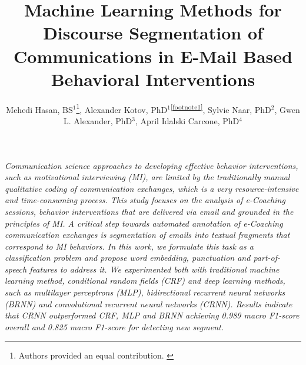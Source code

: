 \documentclass{amia}
\begin{document}
\title{Machine Learning Methods for Discourse Segmentation of Communications in E-Mail Based Behavioral Interventions}

\author{Mehedi Hasan, BS$^{1}$\footnote{Authors provided an equal contribution. \label{footnote1}}, Alexander Kotov, PhD$^{1}$\textsuperscript{\ref{footnote1}}, Sylvie Naar, PhD$^{2}$, Gwen L. Alexander, PhD$^{3}$, April Idalski Carcone, PhD$^{4}$}


\maketitle

\textit{Communication science approaches to developing effective behavior interventions, such as motivational interviewing (MI), are limited by the traditionally manual qualitative coding of communication exchanges, which is a very resource-intensive and time-consuming process. This study focuses on the analysis of e-Coaching sessions, behavior interventions that are delivered via email and grounded in the principles of MI. A critical step towards automated annotation of e-Coaching communication exchanges is segmentation of emails into textual fragments that correspond to MI behaviors. In this work, we formulate this task as a classification problem and propose word embedding, punctuation and part-of-speech features to address it. We experimented both with traditional machine learning method, conditional random fields (CRF) and deep learning methods, such as multilayer perceptrons (MLP), bidirectional recurrent neural networks (BRNN) and convolutional recurrent neural networks (CRNN). Results indicate that CRNN outperformed CRF, MLP and BRNN achieving 0.989 macro F1-score overall and 0.825 macro F1-score for detecting new segment.}
\end{document}

